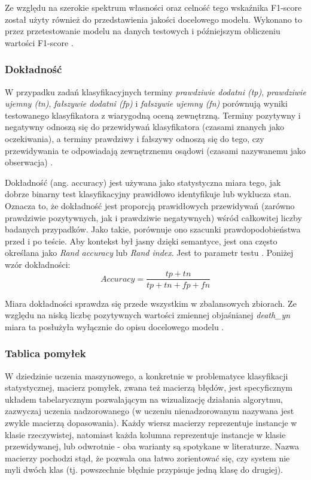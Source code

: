 \documentclass[polish, twoside, 12pt, a4paper]{article}
\theoremstyle{definition}
\theoremstyle{plain}
\theoremstyle{remark}
\begin{document}
Ze względu na szerokie spektrum własności oraz celność tego wskaźnika F1-score został użyty również do przedstawienia jakości docelowego modelu. Wykonano to przez przetestowanie modelu na danych testowych i późniejszym obliczeniu wartości F1-score \cite{powers2011}.

\subsubsection{Dokładność}

W przypadku zadań klasyfikacyjnych terminy \emph{prawdziwie dodatni (tp)}, \emph{prawdziwie ujemny (tn)}, \emph{fałszywie dodatni (fp)} i \emph{fałszywie ujemny (fn)} porównują wyniki testowanego klasyfikatora z wiarygodną oceną zewnętrzną. Terminy pozytywny i negatywny odnoszą się do przewidywań klasyfikatora (czasami znanych jako oczekiwania), a terminy prawdziwy i fałszywy odnoszą się do tego, czy przewidywania te odpowiadają zewnętrznemu osądowi (czasami nazywanemu jako obserwacja) \cite{fawcett2005}.

Dokładność (ang. accuracy) jest używana jako statystyczna miara tego, jak dobrze binarny test klasyfikacyjny prawidłowo identyfikuje lub wyklucza stan. Oznacza to, że dokładność jest proporcją prawidłowych przewidywań (zarówno prawdziwie pozytywnych, jak i prawdziwie negatywnych) wśród całkowitej liczby badanych przypadków. Jako takie, porównuje ono szacunki prawdopodobieństwa przed i po teście. Aby kontekst był jasny dzięki semantyce, jest ona często określana jako \emph{Rand accuracy} lub \emph{Rand index}. Jest to parametr testu \cite{powers2015}. Poniżej wzór dokładności:
\[ Accuracy = \frac{tp + tn}{tp + tn + fp + fn} \]

Miara dokładności sprawdza się przede wszystkim w zbalansowych zbiorach. Ze względu na niską liczbę pozytywnych wartości zmiennej objaśnianej \emph{death\_yn} miara ta posłużyła wyłącznie do opisu docelowego modelu \cite{tharwat2018}.

\subsubsection{Tablica pomyłek}

W dziedzinie uczenia maszynowego, a konkretnie w problematyce klasyfikacji statystycznej, macierz pomyłek, zwana też macierzą błędów, jest specyficznym układem tabelarycznym pozwalającym na wizualizację działania algorytmu, zazwyczaj uczenia nadzorowanego (w uczeniu nienadzorowanym nazywana jest zwykle macierzą dopasowania). Każdy wiersz macierzy reprezentuje instancje w klasie rzeczywistej, natomiast każda kolumna reprezentuje instancje w klasie przewidywanej, lub odwrotnie - oba warianty są spotykane w literaturze. Nazwa macierzy pochodzi stąd, że pozwala ona łatwo zorientować się, czy system nie myli dwóch klas (tj. powszechnie błędnie przypisuje jedną klasę do drugiej).
\end{document}
